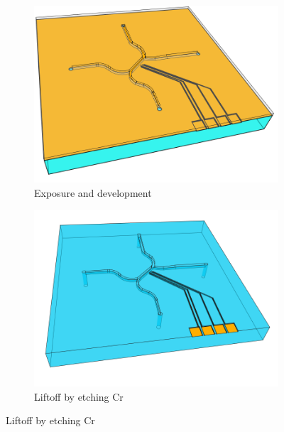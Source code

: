 \documentclass[final]{jyflluk}
\begin{document}
\begin{figure}\ContinuedFloat
    \centering    
    \begin{subfigure}{0.48\textwidth}
        \centering
        \includegraphics[width=\linewidth]{steps/9.developed2.png} 
        \caption{Exposure and development} \label{fig:process9}
    \end{subfigure}
    \hfill
    \begin{subfigure}{0.48\textwidth}
        \centering
        \includegraphics[width=\linewidth]{steps/10.etched.png} 
        \caption{Liftoff by etching Cr} \label{fig:process10}
    \end{subfigure}


\end{figure}
\end{document}
